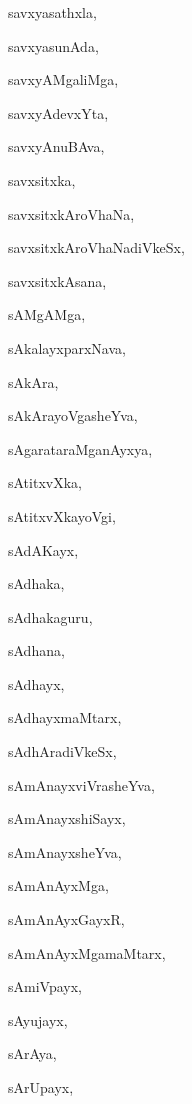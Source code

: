 \begin{multicols}{2}
{savxyasathxla}, \pageref{savxyasathxla}

{savxyasunAda}, \pageref{savxyasunAda}

{savxyAMgaliMga}, \pageref{savxyAMgaliMga}

{savxyAdevxYta}, \pageref{savxyAdevxYta}

{savxyAnuBAva}, \pageref{savxyAnuBAva}

{savxsitxka}, \pageref{savxsitxka}

{savxsitxkAroVhaNa}, \pageref{savxsitxkAroVhaNa}

{savxsitxkAroVhaNadiVkeSx}, \pageref{savxsitxkAroVhaNadiVkeSx}

{savxsitxkAsana}, \pageref{savxsitxkAsana}

{sAMgAMga}, \pageref{sAMgAMga}

{sAkalayxparxNava}, \pageref{sAkalayxparxNava}

{sAkAra}, \pageref{sAkAra}

{sAkArayoVgasheYva}, \pageref{sAkArayoVgasheYva}

{sAgarataraMganAyxya}, \pageref{sAgarataraMganAyxya}

{sAtitxvXka}, \pageref{sAtitxvXka}

{sAtitxvXkayoVgi}, \pageref{sAtitxvXkayoVgi}

{sAdAKayx}, \pageref{sAdAKayx}

{sAdhaka}, \pageref{sAdhaka}

{sAdhakaguru}, \pageref{sAdhakaguru}

{sAdhana}, \pageref{sAdhana}

{sAdhayx}, \pageref{sAdhayx}

{sAdhayxmaMtarx}, \pageref{sAdhayxmaMtarx}

{sAdhAradiVkeSx}, \pageref{sAdhAradiVkeSx}

{sAmAnayxviVrasheYva}, \pageref{sAmAnayxviVrasheYva}

{sAmAnayxshiSayx}, \pageref{sAmAnayxshiSayx}

{sAmAnayxsheYva}, \pageref{sAmAnayxsheYva}

{sAmAnAyxMga}, \pageref{sAmAnAyxMga}

{sAmAnAyxGayxR}, \pageref{sAmAnAyxGayxR}

{sAmAnAyxMgamaMtarx}, \pageref{sAmAnAyxMgamaMtarx}

{sAmiVpayx}, \pageref{sAmiVpayx}

{sAyujayx}, \pageref{sAyujayx}

{sArAya}, \pageref{sArAya}

{sArUpayx}, \pageref{sArUpayx}


\end{multicols}
